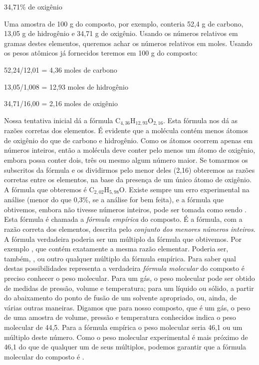 \begin{tightcenter}
34,71\% de oxigênio 
\end{tightcenter}

Uma amostra de 100 g do composto, por exemplo, conteria 52,4 g de carbono, 13,05 g de hidrogênio e 34,71 g de oxigênio. Usando os números relativos em gramas destes elementos, queremos achar os números relativos em moles. Usando os pesos atômicos já fornecidos teremos em 100 g do composto:

\begin{tightcenter}
52,24/12,01 = 4,36 moles de carbono 

13,05/1,008 = 12,93 moles de hidrogênio 

34,71/16,00 = 2,16 moles de oxigênio 
\end{tightcenter}

Nossa tentativa inicial dá a fórmula C$_{4,36}$H$_{12,93}$O$_{2,16}$. Esta fórmula nos dá as razões corretas dos elementos. É evidente que a molécula contém menos átomos de oxigênio do que de carbono e hidrogênio. Como os átomos ocorrem apenas em números inteiros, então a molécula deve conter pelo menos um átomo de oxigênio, embora possa conter dois, três ou mesmo algum número maior. Se tomarmos os subscritos da fórmula e os dividirmos pelo menor deles (2,16) obteremos as razões corretas entre os elementos, na base da presença de um único átomo de oxigênio. A fórmula que obteremos é C$_{2,02}$H$_{5,98}$O. Existe sempre um erro experimental na análise (menor do que 0,3\%, se a análise for bem feita), e a fórmula que obtivemos, embora não tivesse números inteiros, pode ser tomada como sendo . Esta fórmula é chamada a \textit{fórmula empírica} do composto. É a fórmula, com a razão correta dos elementos, descrita pelo \textit{conjunto dos menores números inteiros}. A fórmula verdadeira poderia ser um múltiplo da fórmula que obtivemos. Por exemplo , que contém exatamente a mesma razão elementar. Poderia ser, também, , ou outro qualquer múltiplo da fórmula empírica. Para saber qual destas possibilidades representa a verdadeira \textit{fórmula molecular} do composto é preciso conhecer o peso molecular. Para um gás, o peso molecular pode ser obtido de medidas de pressão, volume e temperatura; para um líquido ou sólido, a partir do abaixamento do ponto de fusão de um solvente apropriado, ou, ainda, de várias outras maneiras. Digamos que para nosso composto, que é um gás, o peso de uma amostra de volume, pressão e temperatura conhecidos indica o peso molecular de 44,5. Para a fórmula empírica  o peso molecular seria 46,1 ou um múltiplo deste número. Como o peso molecular experimental é mais próximo de 46,1 do que de qualquer um de seus múltiplos, podemos garantir que a fórmula molecular do composto é .

